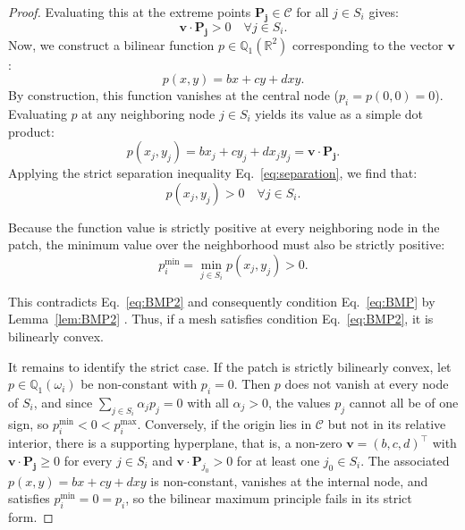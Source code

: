 \documentclass[10pt,a4paper]{amsart}
\begin{document}
\begin{proof}
Evaluating this at the extreme points $\mathbf{P_j} \in \mathcal{C}$ for all $j \in S_i$ gives:
\begin{equation}
\mathbf{v} \cdot \mathbf{P_j} > 0 \quad \forall j \in S_i. \label{eq:separation}
\end{equation}
Now, we construct a bilinear function $p \in \mathbb{Q}_1(\mathbb{R}^2)$ corresponding to the vector $\mathbf{v}$ :
$$
p(x,y) = bx + cy + dxy.
$$
By construction, this function vanishes at the central node ($p_i = p(0,0) = 0$). Evaluating $p$ at any neighboring node $j \in S_i$ yields its value as a simple dot product:
$$
p(x_j, y_j) = bx_j + cy_j + dx_j y_j = \mathbf{v} \cdot \mathbf{P_j}.
$$
Applying the strict separation inequality Eq.~\eqref{eq:separation}, we find that:
$$
p(x_j, y_j) > 0 \quad \forall j \in S_i.
$$

Because the function value is strictly positive at every neighboring node in the patch, the minimum value over the neighborhood must also be strictly positive:
$$
p_i^{\min} = \min_{j \in S_i} p(x_j, y_j) > 0.
$$

This contradicts Eq.~\eqref{eq:BMP2} and consequently condition Eq.~\eqref{eq:BMP} by Lemma~\ref{lem:BMP2} . Thus, if a mesh satisfies condition Eq.~\eqref{eq:BMP2}, it is bilinearly convex.

It remains to identify the strict case. If the patch is strictly bilinearly convex, let $p \in \mathbb{Q}_1(\omega_i)$ be non-constant with $p_i = 0$. Then $p$ does not vanish at every node of $S_i$, and since $\sum_{j \in S_i} \alpha_j p_j = 0$ with all $\alpha_j > 0$, the values $p_j$ cannot all be of one sign, so $p_i^{\min} < 0 < p_i^{\max}$. Conversely, if the origin lies in $\mathcal{C}$ but not in its relative interior, there is a supporting hyperplane, that is, a non-zero $\mathbf{v} = (b,c,d)^\top$ with $\mathbf{v} \cdot \mathbf{P_j} \geq 0$ for every $j \in S_i$ and $\mathbf{v} \cdot \mathbf{P}_{j_0} > 0$ for at least one $j_0 \in S_i$. The associated $p(x,y) = bx + cy + dxy$ is non-constant, vanishes at the internal node, and satisfies $p_i^{\min} = 0 = p_i$, so the bilinear maximum principle fails in its strict form.
\end{proof}
\end{document}
